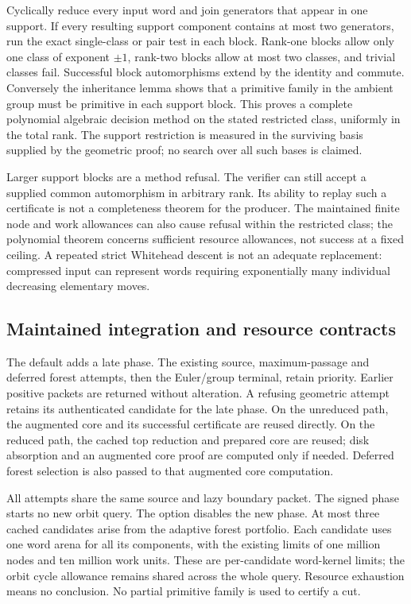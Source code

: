 Cyclically reduce every input word and join generators that appear in
one support.  If every resulting support component contains at most two
generators, run the exact single-class or pair test in each block.
Rank-one blocks allow only one class of exponent $\pm1$, rank-two blocks
allow at most two classes, and trivial classes fail.  Successful block
automorphisms extend by the identity and commute.  Conversely the
inheritance lemma shows that a primitive family in the ambient group
must be primitive in each support block.  This proves a complete
polynomial algebraic decision method on the stated restricted class,
uniformly in the total rank.  The support restriction is measured in the
surviving basis supplied by the geometric proof; no search over all such
bases is claimed.

Larger support blocks are a method refusal.  The verifier can still
accept a supplied common automorphism in arbitrary rank.  Its ability
to replay such a certificate is not a completeness theorem for the
producer.  The maintained finite node and work allowances can also
cause refusal within the restricted class; the polynomial theorem
concerns sufficient resource allowances, not success at a fixed ceiling.
A repeated strict Whitehead descent is not an adequate replacement:
compressed input can represent words requiring exponentially many
individual decreasing elementary moves.

\subsection{Maintained integration and resource contracts}

The default  adds a late phase.
The existing source, maximum-passage and deferred forest attempts, then
the Euler/group terminal, retain priority.  Earlier positive packets
are returned without alteration.  A refusing geometric attempt retains
its authenticated candidate for the late phase.  On the unreduced path,
the augmented core and its successful certificate are reused directly.
On the reduced path, the cached top reduction and prepared core are
reused; disk absorption and an augmented core proof are computed only
if needed.  Deferred forest selection is also passed to that augmented
core computation.

All attempts share the same source and lazy boundary packet.  The signed
phase starts no new orbit query.  The  option disables the
new phase.  At most three cached candidates arise from the adaptive
forest portfolio.  Each candidate uses one word arena for all its
components, with the existing limits of one million nodes and ten
million work units.  These are per-candidate word-kernel limits; the
orbit cycle allowance remains shared across the whole query.
Resource exhaustion means no conclusion.  No partial primitive family
is used to certify a cut.

